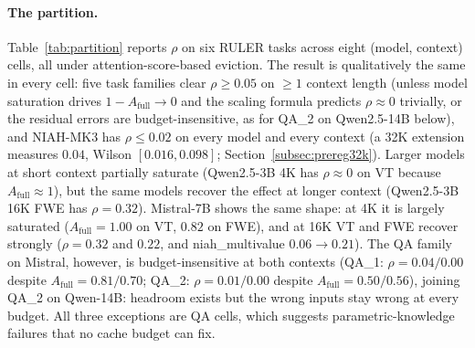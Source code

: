 \documentclass{article}
\begin{document}
\paragraph{The partition.} Table~\ref{tab:partition} reports $\rho$
on six RULER tasks across eight (model, context) cells, all under
attention-score-based eviction. The result is
qualitatively the same in every cell: five task families clear $\rho \ge 0.05$
on $\geq 1$ context length (unless model saturation drives $1 - A_{\mathrm{full}}
\to 0$ and the scaling formula predicts $\rho \approx 0$ trivially, or the
residual errors are budget-insensitive, as for QA\_2 on Qwen2.5-14B below),
and NIAH-MK3 has $\rho \le 0.02$ on every
model and every context (a 32K extension measures $0.04$, Wilson
$[0.016, 0.098]$; Section~\ref{subsec:prereg32k}). Larger models at short
context partially saturate
(Qwen2.5-3B 4K has $\rho \approx 0$ on VT because $A_{\mathrm{full}} \approx 1$),
but the same models recover the effect at longer context (Qwen2.5-3B 16K FWE has
$\rho = 0.32$). Mistral-7B shows the same shape: at 4K it is largely saturated
($A_{\mathrm{full}} = 1.00$ on VT, $0.82$ on FWE), and at 16K VT and FWE
recover strongly ($\rho = 0.32$ and $0.22$, and niah\_multivalue
$0.06 \to 0.21$). The QA family on Mistral, however, is budget-insensitive
at both contexts (QA\_1: $\rho = 0.04 / 0.00$ despite
$A_{\mathrm{full}} = 0.81 / 0.70$; QA\_2: $\rho = 0.01 / 0.00$ despite
$A_{\mathrm{full}} = 0.50 / 0.56$), joining QA\_2 on Qwen-14B: headroom
exists but the wrong inputs stay wrong at every budget. All three
exceptions are QA cells, which suggests parametric-knowledge failures that no
cache budget can fix.
\end{document}
